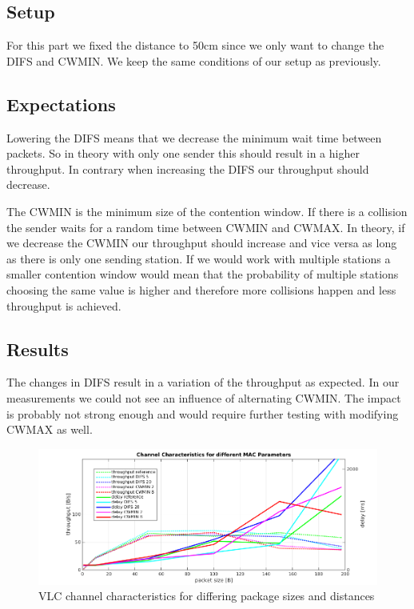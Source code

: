 \subsection{Setup}
For this part we fixed the distance to 50cm since we only want to change the DIFS and CWMIN. We keep the same conditions of our setup as previously.

\subsection{Expectations}
Lowering the DIFS means that we decrease the minimum wait time between packets. So in theory with only one sender this should result in a higher throughput.
In contrary when increasing the DIFS our throughput should decrease.

The CWMIN is the minimum size of the contention window. If there is a collision the sender waits for a random time between CWMIN and CWMAX.
In theory, if we decrease the CWMIN our throughput should increase and vice versa as long as there is only one sending station.
If we would work with multiple stations a smaller contention window would mean that the probability of multiple stations choosing the same value is higher and therefore more collisions happen and less throughput is achieved.

\subsection{Results}
The changes in DIFS result in a variation of the throughput as expected.
In our measurements we could not see an influence of alternating CWMIN.
The impact is probably not strong enough and would require further testing with modifying CWMAX as well.

\begin{figure}[htp]
\centering
\includegraphics[width=\textwidth]{../img/plot_mac_parameters.png}
\caption{VLC channel characteristics for differing package sizes and distances}
\label{fig:chanchar}
\end{figure}